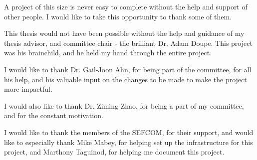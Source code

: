 A project of this size is never easy to complete without the help and support of other people. I would like to take this opportunity to thank some of them.

This thesis would not have been possible without the help and guidance of my thesis advisor, and committee chair - the brilliant Dr. Adam Doupe.
This project was his brainchild, and he held my hand through the entire project.

I would like to thank Dr. Gail-Joon Ahn, for being part of the committee, for all his help, and his valuable input on the changes to be made to make the project more impactful.

I would also like to thank Dr. Ziming Zhao, for being a part of my committee, and for the constant motivation.

I would like to thank the members of the SEFCOM, for their support, and would like to especially thank Mike Mabey, for helping set up the infrastructure for this project, and Marthony Taguinod, for helping me document this project.